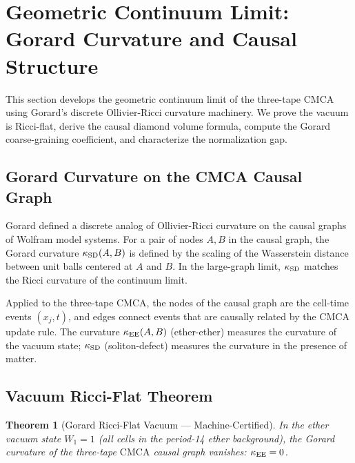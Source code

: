 \documentclass[11pt]{article}
\newtheorem{theorem}{Theorem}[section]
\theoremstyle{remark}
\newcommand{\CMCA}{\text{CMCA}}
\begin{document}
\FloatBarrier

\section{Geometric Continuum Limit: Gorard Curvature and Causal Structure}
\label{sec:gorard}

This section develops the geometric continuum limit of the three-tape $\CMCA$
using Gorard's discrete Ollivier-Ricci curvature machinery. We prove the
vacuum is Ricci-flat, derive the causal diamond volume formula, compute the
Gorard coarse-graining coefficient, and characterize the normalization gap.

\subsection{Gorard Curvature on the CMCA Causal Graph}

Gorard \cite{Gorard2020Rel} defined a discrete analog of Ollivier-Ricci
curvature on the causal graphs of Wolfram model systems. For a pair of
nodes $A, B$ in the causal graph, the Gorard curvature $\kappa_{\rm SD}(A,B)$
is defined by the scaling of the Wasserstein distance between unit balls
centered at $A$ and $B$. In the large-graph limit, $\kappa_{\rm SD}$ matches
the Ricci curvature of the continuum limit.

Applied to the three-tape $\CMCA$, the nodes of the causal graph are the
cell-time events $(x_j, t)$, and edges connect events that are causally
related by the $\CMCA$ update rule. The curvature $\kappa_{\rm EE}(A,B)$
(ether-ether) measures the curvature of the vacuum state; $\kappa_{\rm SD}$
(soliton-defect) measures the curvature in the presence of matter.

\subsection{Vacuum Ricci-Flat Theorem}

\begin{theorem}[Gorard Ricci-Flat Vacuum --- Machine-Certified]
\label{thm:ricci-flat}
In the ether vacuum state $W_1 = 1$ (all cells in the period-14 ether
background), the Gorard curvature of the three-tape $\CMCA$ causal graph
vanishes: $\kappa_{\rm EE} = 0$.
\end{theorem}
\end{document}
